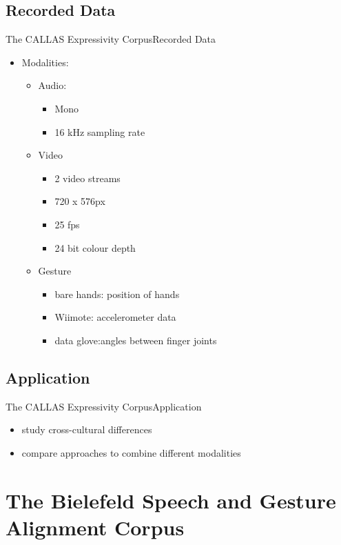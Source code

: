 \documentclass{beamer}
\begin{document}
		\subsection{Recorded Data}
			\begin{frame}{The CALLAS Expressivity Corpus}{Recorded Data}										
				\begin{itemize}
					\item Modalities:
					\begin{itemize}
						\item Audio:
						 \begin{itemize}
						 	\item Mono
						 	\item 16 kHz sampling rate
						 \end{itemize}
						 \item Video
						 \begin{itemize}
						 	\item 2 video streams
						 	\item 720 x 576px
						 	\item 25 fps
						 	\item 24 bit colour depth
						 \end{itemize}
						 \item Gesture
						 \begin{itemize}
						 	\item bare hands: position of hands
						 	\item Wiimote: accelerometer data
						 	\item data glove:angles between finger joints
						 \end{itemize}
					\end{itemize}
				\end{itemize}
			\end{frame}
		\subsection{Application}
			\begin{frame}{The CALLAS Expressivity Corpus}{Application}
				\begin{itemize}
					\item study cross-cultural differences
					\item compare approaches to combine different modalities
				\end{itemize}
			\end{frame}	
	
	\section{The Bielefeld Speech and Gesture Alignment Corpus}
\end{document}
